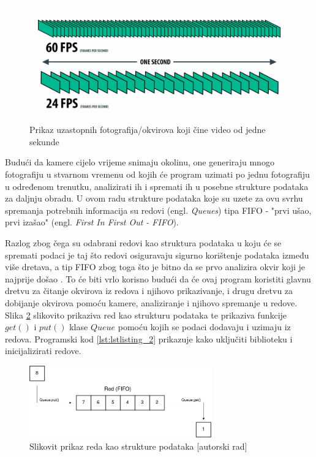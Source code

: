 \documentclass{foi}
\begin{document}
\begin{figure}[h!]
    \centering
    \includegraphics[width=1\textwidth]{slike/frames-per-second-diagram}
    \caption{Prikaz uzastopnih fotografija/okvirova koji čine video od jedne sekunde \cite{AnimoticaBlog2020}}
    \label{fig:slika_frame}
\end{figure}

Budući da kamere cijelo vrijeme snimaju okolinu, one generiraju mnogo fotografiju u stvarnom vremenu od kojih će program uzimati po jednu fotografiju u određenom trenutku, analizirati ih i spremati ih u posebne strukture podataka za daljnju obradu. U ovom radu strukture podataka koje su uzete za ovu svrhu spremanja potrebnih informacija su redovi (engl. \emph{Queues}) tipa FIFO - "prvi ušao, prvi izašao" (engl. \emph{First In First Out - FIFO}).

Razlog zbog čega su odabrani redovi kao struktura podataka u koju će se spremati podaci je taj što redovi osiguravaju sigurno korištenje podataka između više dretava, a tip FIFO zbog toga što je bitno da se prvo analizira okvir koji je najprije došao \cite{PythonSoftwareFoundation}. To će biti vrlo korisno budući da će ovaj program koristiti glavnu dretvu za čitanje okvirova iz redova i njihovo prikazivanje, i drugu dretvu za dobijanje okvirova pomoću kamere, analiziranje i njihovo spremanje u redove. Slika \ref{fig:dijagram_red} slikovito prikaziva red kao strukturu podataka te prikaziva funkcije $get()$ i $put()$ klase $Queue$ pomoću kojih se podaci dodavaju i uzimaju iz redova. Programski kod \ref{lst:lstlisting_2} prikazuje kako uključiti biblioteku i inicijalizirati redove.

\begin{figure}[h!]
    \centering
    \includegraphics[width=0.7\textwidth]{slike/redovi_dijagram}
    \caption{Slikovit prikaz reda kao strukture podataka [autorski rad]}
    \label{fig:dijagram_red}
\end{figure}
\end{document}
